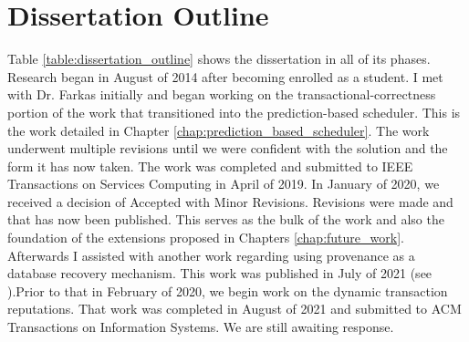 \section{Dissertation Outline}
\label{diss:dissertation_outline}

\newcommand{\dissPhaseOne}
{\textbf{Transactional Correctness:} Consistency control algorithms prototyped and formally proven as a part of prediction-based solution (\gls{pbs}). \textbf{Published in IEEE Transactions, February 2020}\newline}

\newcommand{\dissPhaseTwo}
{\textbf{Dissertation Proposal}}

\newcommand{\dissPhaseThree}
{\textbf{Dynamic Transaction Reputation:} Analyze and leverage reputation management solutions within \gls{pbs} \textbf{Submitted to ACM Transactions of Information Systems\newline}}

\newcommand{\dissPhaseFour}
{\textbf{Database Recovery using Provenance:} Assisted with publication with other students. \textbf{Published in Data 2021} }

\newcommand{\dissPhaseFive}
{\textbf{Dissertation Defense}}


Table \ref{table:dissertation_outline} shows the dissertation in all of its phases. Research began in August of 2014 after becoming enrolled as a student. I met with Dr. Farkas initially and began working on the transactional-correctness portion of the work that transitioned into the prediction-based scheduler. This is the work detailed in Chapter \ref{chap:prediction_based_scheduler}. The work underwent multiple revisions until we were confident with the solution and the form it has now taken. The work was completed and submitted to IEEE Transactions on Services Computing in April of 2019. In January of 2020, we received a decision of Accepted with Minor Revisions. Revisions were made and that has now been published. This serves as the bulk of the work and also the foundation of the extensions proposed in Chapters \ref{chap:future_work}. Afterwards I assisted with another work regarding using provenance as a database recovery mechanism. This work was published in July of 2021 (see \cite{theppatorn_2021}).Prior to that in February of 2020, we begin work on the dynamic transaction reputations. That work was completed in August of 2021 and submitted to ACM Transactions on Information Systems. We are still awaiting response.

